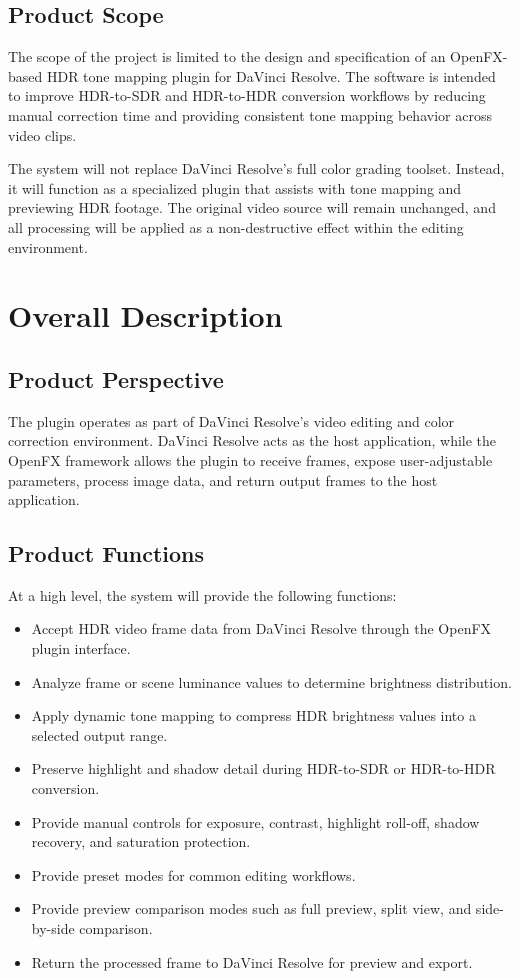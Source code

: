 \documentclass[12pt]{article}
\begin{document}
\subsection{Product Scope}
The scope of the project is limited to the design and specification of an OpenFX-based HDR tone mapping plugin for DaVinci Resolve. The software is intended to improve HDR-to-SDR and HDR-to-HDR conversion workflows by reducing manual correction time and providing consistent tone mapping behavior across video clips.

The system will not replace DaVinci Resolve's full color grading toolset. Instead, it will function as a specialized plugin that assists with tone mapping and previewing HDR footage. The original video source will remain unchanged, and all processing will be applied as a non-destructive effect within the editing environment.


\section{Overall Description}

\subsection{Product Perspective}
The plugin operates as part of DaVinci Resolve's video editing and color correction environment. DaVinci Resolve acts as the host application, while the OpenFX framework allows the plugin to receive frames, expose user-adjustable parameters, process image data, and return output frames to the host application.

\subsection{Product Functions}
At a high level, the system will provide the following functions:

\begin{itemize}
    \item Accept HDR video frame data from DaVinci Resolve through the OpenFX plugin interface.
    \item Analyze frame or scene luminance values to determine brightness distribution.
    \item Apply dynamic tone mapping to compress HDR brightness values into a selected output range.
    \item Preserve highlight and shadow detail during HDR-to-SDR or HDR-to-HDR conversion.
    \item Provide manual controls for exposure, contrast, highlight roll-off, shadow recovery, and saturation protection.
    \item Provide preset modes for common editing workflows.
    \item Provide preview comparison modes such as full preview, split view, and side-by-side comparison.
    \item Return the processed frame to DaVinci Resolve for preview and export.
\end{itemize}
\end{document}
